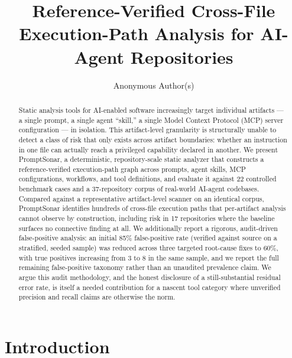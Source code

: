 \documentclass[sigconf,anonymous,review]{acmart}
\newcommand{\sysname}{PromptSonar}
\begin{document}
\title{Reference-Verified Cross-File Execution-Path Analysis for AI-Agent Repositories}

\author{Anonymous Author(s)}

\begin{abstract}
Static analysis tools for AI-enabled software increasingly target individual artifacts --- a single prompt, a single agent ``skill,'' a single Model Context Protocol (MCP) server configuration --- in isolation. This artifact-level granularity is structurally unable to detect a class of risk that only exists across artifact boundaries: whether an instruction in one file can actually reach a privileged capability declared in another. We present \sysname{}, a deterministic, repository-scale static analyzer that constructs a reference-verified execution-path graph across prompts, agent skills, MCP configurations, workflows, and tool definitions, and evaluate it against 22 controlled benchmark cases and a 37-repository corpus of real-world AI-agent codebases. Compared against a representative artifact-level scanner on an identical corpus, \sysname{} identifies hundreds of cross-file execution paths that per-artifact analysis cannot observe by construction, including risk in 17 repositories where the baseline surfaces no connective finding at all. We additionally report a rigorous, audit-driven false-positive analysis: an initial 85\% false-positive rate (verified against source on a stratified, seeded sample) was reduced across three targeted root-cause fixes to 60\%, with true positives increasing from 3 to 8 in the same sample, and we report the full remaining false-positive taxonomy rather than an unaudited prevalence claim. We argue this audit methodology, and the honest disclosure of a still-substantial residual error rate, is itself a needed contribution for a nascent tool category where unverified precision and recall claims are otherwise the norm.
\end{abstract}

\maketitle

\section{Introduction}
\end{document}
